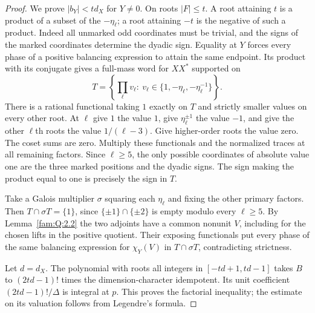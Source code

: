 \documentclass[11pt,a4paper]{article}
\numberwithin{equation}{section}
\theoremstyle{remark}
\begin{document}
\begin{proof}
We prove $|b_Y|<t d_X$ for $Y\ne0$. On roots $|F|\le t$. A root attaining $t$ is a product of a subset of the $-\eta_\ell$; a root attaining $-t$ is the negative of such a product. Indeed all unmarked odd coordinates must be trivial, and the signs of the marked coordinates determine the dyadic sign. Equality at $Y$ forces every phase of a positive balancing expression to attain the same endpoint. Its product with its conjugate gives a full-mass word for $XX^*$ supported on
\[
 T=\left\{\prod_\ell v_\ell:\ v_\ell\in\{1,-\eta_\ell,-\eta_\ell^{-1}\}\right\}.
\]
There is a rational functional taking $1$ exactly on $T$ and strictly smaller values on every other root. At $\ell$ give $1$ the value $1$, give $\eta_\ell^{\pm1}$ the value $-1$, and give the other $\ell$th roots the value $1/(\ell-3)$. Give higher-order roots the value zero. The coset sums are zero. Multiply these functionals and the normalized traces at all remaining factors. Since $\ell\ge5$, the only possible coordinates of absolute value one are the three marked positions and the dyadic signs. The sign making the product equal to one is precisely the sign in $T$.

Take a Galois multiplier $\sigma$ squaring each $\eta_\ell$ and fixing the other primary factors. Then $T\cap\sigma T=\{1\}$, since $\{\pm1\}\cap\{\pm2\}$ is empty modulo every $\ell\ge5$. By Lemma~\ref{fam:Q:2.2} the two adjoints have a common nonunit
$V$, including for the chosen lifts in the positive quotient.
Their exposing functionals put every phase of the same balancing
expression for $\chi_Y(V)$ in $T\cap\sigma T$, contradicting strictness.

Let $d=d_X$. The polynomial with roots all integers in $[-td+1,td-1]$ takes $B$ to $(2td-1)!$ times the dimension-character idempotent. Its unit coefficient $(2td-1)!/\Delta$ is integral at $p$. This proves the factorial inequality; the estimate on its valuation follows from Legendre's formula.
\end{proof}
\end{document}
